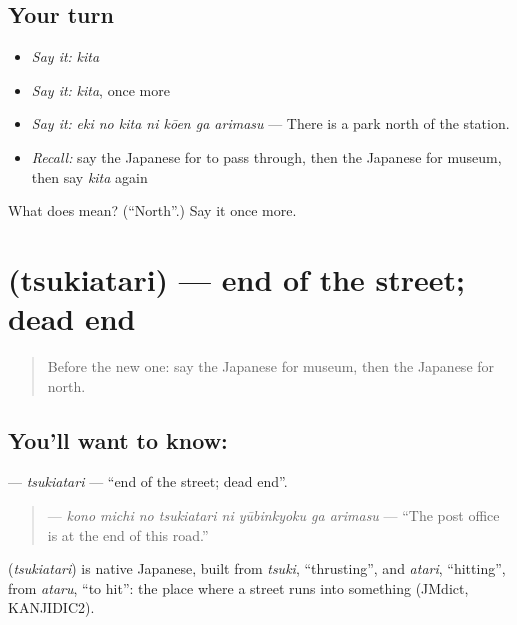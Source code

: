 \subsection*{Your turn}
\begin{itemize}
\raggedright
  \item \emph{Say it:} \emph{kita}
  \item \emph{Say it:} \emph{kita}, once more
  \item \emph{Say it:} \emph{eki no kita ni kōen ga arimasu} — There is a park north of the station.
  \item \emph{Recall:} say the Japanese for to pass through, then the Japanese for museum, then say \emph{kita} again
\end{itemize}

\begin{tcolorbox}[breakable,colback=teal!4,colframe=teal!35!black,title={Before you move on}]
What does  mean? (\textquotedblleft{}North\textquotedblright{}.) Say it once more.
\end{tcolorbox}
\section[\texorpdfstring{\ja{つきあたり} (tsukiatari)}{つきあたり (tsukiatari)}]{ (tsukiatari) — end of the street; dead end}

\label{lesson:JA-C195-tsukiatari}



\begin{quote}
Before the new one: say the Japanese for museum, then the Japanese for north.
\end{quote}

\subsection*{You'll want to know: }
\textbf{} — \emph{tsukiatari} — \textquotedblleft{}end of the street; dead end\textquotedblright{}.

\begin{quote}
\textbf{    } — \emph{kono michi no tsukiatari ni yūbinkyoku ga arimasu} — \textquotedblleft{}The post office is at the end of this road.\textquotedblright{}
\end{quote}

\begin{cousinweb}
\textbf{} (\emph{tsukiatari}) is native Japanese, built from \emph{tsuki}, \textquotedblleft{}thrusting\textquotedblright{}, and \emph{atari}, \textquotedblleft{}hitting\textquotedblright{}, from \emph{ataru}, \textquotedblleft{}to hit\textquotedblright{}: the place where a street runs into something (JMdict, KANJIDIC2).
\end{cousinweb}

